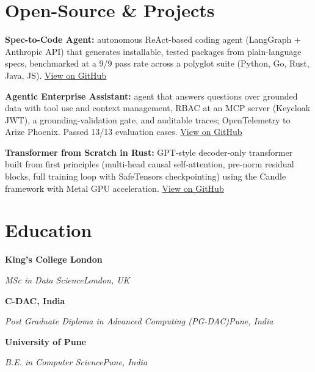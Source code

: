 \documentclass[10pt,a4paper]{article}
\newcommand{\entry}[4]{%
  {\color{company}\bfseries #1}\hfill {\color{muted}#2}\par
  \vspace{1pt}
  {\itshape #3}\hfill {\color{muted}\itshape #4}\par
  \vspace{3pt}%
}
\begin{document}
\section{Open-Source \& Projects}
\begin{tight}
  \item \textbf{Spec-to-Code Agent:} autonomous ReAct-based coding agent (LangGraph + Anthropic API) that generates installable, tested packages from plain-language specs, benchmarked at a 9/9 pass rate across a polyglot suite (Python, Go, Rust, Java, JS). \href{https://github.com/abhijeetscode/Spec-to-Code-Agent}{View on GitHub}
  \item \textbf{Agentic Enterprise Assistant:} agent that answers questions over grounded data with tool use and context management, RBAC at an MCP server (Keycloak JWT), a grounding-validation gate, and auditable traces; OpenTelemetry to Arize Phoenix. Passed 13/13 evaluation cases. \href{https://github.com/abhijeetscode/Agentic-Enterprise-Assistant}{View on GitHub}
  \item \textbf{Transformer from Scratch in Rust:} GPT-style decoder-only transformer built from first principles (multi-head causal self-attention, pre-norm residual blocks, full training loop with SafeTensors checkpointing) using the Candle framework with Metal GPU acceleration. \href{https://github.com/abhijeetscode/transformer-rust}{View on GitHub}
\end{tight}

\section{Education}
\entry{King's College London}{}{MSc in Data Science}{London, UK}
\vspace{-3pt}
\entry{C-DAC, India}{}{Post Graduate Diploma in Advanced Computing (PG-DAC)}{Pune, India}
\vspace{-3pt}
\entry{University of Pune}{}{B.E. in Computer Science}{Pune, India}
\end{document}
